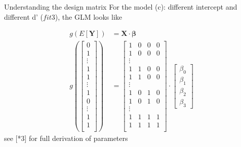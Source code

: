 \documentclass[10pt]{beamer}
\begin{document}
\begin{frame}[fragile]{Understanding the design matrix}
For the model (c): different intercept and different d' ($fit3$), the GLM looks like 

\begin{align*}
g(E[\mathbf{Y}]) &= \mathbf{X} \cdot \mathbf{\beta}\\
    g( 
    \begin{bmatrix}
           0 \\
           1 \\
           \vdots \\
           1 \\
           1 \\
           \vdots \\
           1 \\
           0 \\
           \vdots \\
           1 \\
           1 \\
    \end{bmatrix} ) &= 
    \begin{bmatrix}
           1 & 0 & 0 & 0\\
           1 & 0 & 0 & 0\\
           \vdots \\
           1 & 1 & 0 & 0\\
           1 & 1 & 0 & 0\\
           \vdots \\
           1 & 0 & 1 & 0\\
           1 & 0 & 1 & 0\\
           \vdots \\
           1 & 1 & 1 & 1\\
           1 & 1 & 1 & 1\\
    \end{bmatrix} \cdot
    \begin{bmatrix}
           \beta_0 \\
           \beta_1 \\
           \beta_2 \\
           \beta_3 
    \end{bmatrix}
\end{align*}
{\small \hfill see [*3] for full derivation of parameters}
\end{frame}
\end{document}
